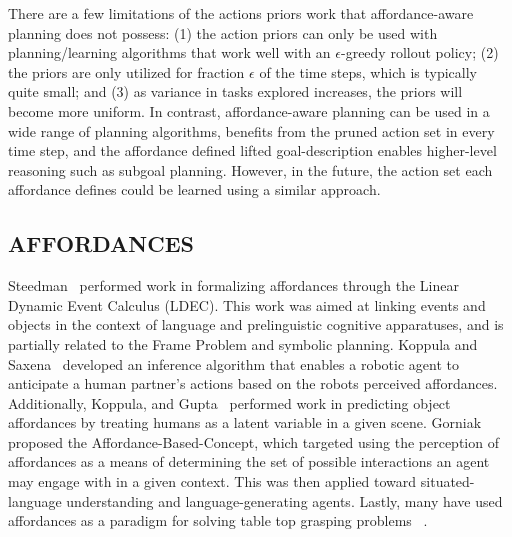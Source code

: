 \documentclass[]{article}
\newcommand{\dnote}[1]{\textcolor{Orange}{\textbf{D: #1}}}
\begin{document}
There are a few limitations of the actions priors work that affordance-aware planning does not possess: (1) the action priors can only be used with planning/learning algorithms that work well with an $\epsilon$-greedy rollout policy; (2) the priors are only utilized for fraction $\epsilon$ of the time steps, which is typically quite small; and (3) as variance in tasks explored increases, the priors will become more uniform. In contrast, affordance-aware planning can be used in a wide range of planning algorithms, benefits from the pruned action set in every time step, and the affordance defined lifted goal-description enables higher-level reasoning such as subgoal planning. However, in the future, the action set each affordance defines could be learned using a similar approach.

\subsection{AFFORDANCES}
Steedman~\citep{steedman02} performed work in formalizing affordances through the 
Linear Dynamic Event Calculus (LDEC). This work was aimed at linking events and 
objects in the context of language and prelinguistic cognitive apparatuses, and is 
partially related to the Frame Problem and symbolic planning. Koppula and Saxena~\citep{koppula13a} 
developed an inference algorithm that enables a robotic agent to anticipate a human partner's 
actions based on the robots perceived affordances. Additionally, Koppula, and Gupta~\citep{koppula13c} 
performed work in predicting object affordances by treating humans as a latent variable in a given scene. 
Gorniak~\citep{gorniak05} proposed the Affordance-Based-Concept, which targeted using the perception 
of affordances as a means of determining the set of possible interactions an agent may engage with in a given context.
This was then applied toward situated-language understanding and language-generating agents. Lastly, 
many have used affordances as a paradigm for solving table top grasping problems ~\citep{pas13,sweeney07,detry09,montesano09}.
\end{document}
